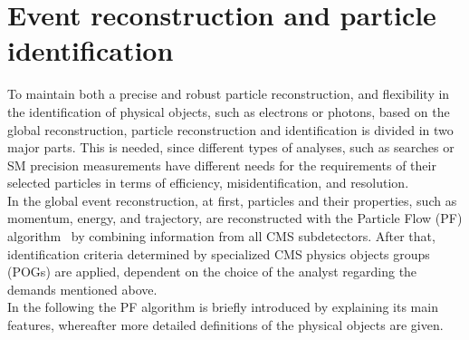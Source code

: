 \section{Event reconstruction and particle identification}\label{sec:reco}
To maintain both a precise and robust particle reconstruction, and flexibility in the identification of physical objects, such as electrons or photons, based on the global reconstruction, particle reconstruction and identification is divided in two major parts. This is needed, since different types of analyses, such as searches or SM precision measurements have different needs for the requirements of their selected particles in terms of efficiency, misidentification, and resolution.\\
In the global event reconstruction, at first, particles and their properties, such as momentum, energy, and trajectory, are reconstructed with the Particle Flow (PF) algorithm~\cite{ParticleFlow} by combining information from all CMS subdetectors. After that, identification criteria determined by specialized CMS physics objects groups (POGs) are applied, dependent on the choice of the analyst regarding the demands mentioned above.\\
In the following the PF algorithm is briefly introduced by explaining its main features, whereafter more detailed definitions of the physical objects are given.

